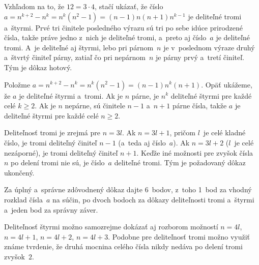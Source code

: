 {%
Vzhľadom na to, že $12 = 3\cdot 4$, stačí ukázať, že číslo $a = n^{k + 2} - n^k =
n^k ({n^2 - 1}) =(n - 1)n(n + 1)n^{k - 1}$
je deliteľné tromi a~štyrmi. Prvé tri činitele posledného výrazu sú
tri po sebe idúce prirodzené čísla, takže práve jedno z~nich je deliteľné tromi,
a~preto aj číslo~$a$ je deliteľné tromi.
A~je deliteľné aj štyrmi, lebo pri párnom~$n$ je v~poslednom výraze druhý
a~štvrtý činiteľ párny, zatiaľ čo pri nepárnom~$n$ je párny prvý a~tretí
činiteľ. Tým je dôkaz hotový.

\ineriesenie
Položme $a = n^{k + 2} - n^k =n^k (n^2 - 1) =(n - 1)n^k(n + 1)$.
Opäť ukážeme, že $a$ je deliteľné štyrmi a~tromi. Ak je $n$ párne, je
$n^k$ deliteľné štyrmi pre každé celé $k\ge 2$.
Ak je $n$ nepárne, sú činitele $n-1$ a~$n+1$ párne čísla,
takže $a$ je deliteľné štyrmi pre každé celé $n\ge 2$.

Deliteľnosť tromi je zrejmá pre $n=3l$. Ak $n=3l+1$, pričom $l$~je celé
kladné číslo, je tromi deliteľný činiteľ $n-1$ (a~teda aj číslo~$a$). Ak
$n=3l+2$  ($l$~je celé nezáporné), je tromi deliteľný činiteľ $n+1$. Keďže
iné možnosti pre zvyšok čísla~$n$ po delení tromi nie sú,
je číslo~$a$ deliteľné tromi. Tým je požadovaný dôkaz ukončený.

\nobreak\medskip\petit\noindent
Za úplný a~správne zdôvodnený dôkaz dajte 6~bodov,
z~toho 1~bod za vhodný rozklad čísla~$a$ na súčin, po dvoch bodoch za
dôkazy deliteľnosti tromi a~štyrmi a~jeden bod za správny záver.

Deliteľnosť štyrmi možno samozrejme dokázať aj rozborom možností
$n=4l$, $n=4l+1$, $n=4l+2$, $n=4l+3$. Podobne pre
deliteľnosť tromi možno využiť známe tvrdenie, že druhá mocnina
celého čísla nikdy nedáva po delení tromi zvyšok~$2$.
\endpetit
\bigbreak
}

